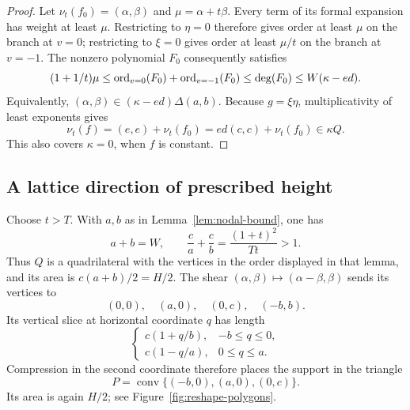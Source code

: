 \begin{proof}
Let $\nu_t(f_0)=(\alpha,\beta)$ and $\mu=\alpha+t\beta$.
Every term of its formal expansion has weight at least $\mu$.
Restricting to $\eta=0$ therefore gives order at least $\mu$ on the branch
at $v=0$; restricting to $\xi=0$ gives order at least $\mu/t$ on the
branch at $v=-1$.  The nonzero polynomial $F_0$ consequently satisfies
\[
 (1+1/t)\mu
 \le \operatorname{ord}_{v=0}(F_0)+\operatorname{ord}_{v=-1}(F_0)
 \le \deg(F_0)\le W(\kappa-ed).
\]
Equivalently, $(\alpha,\beta)\in(\kappa-ed)\Delta(a,b)$.
Because $g=\xi\eta$, multiplicativity of least exponents gives
\[
 \nu_t(f)=(e,e)+\nu_t(f_0)
          =ed(c,c)+\nu_t(f_0)\in\kappa Q.
\]
This also covers $\kappa=0$, when $f$ is constant.
\end{proof}

\subsection{A lattice direction of prescribed height}

Choose $t>T$.  With $a,b$ as in Lemma~\ref{lem:nodal-bound}, one has
\[
 a+b=W,\qquad
 \frac ca+\frac cb=\frac{(1+t)^2}{Tt}>1.
\]
Thus $Q$ is a quadrilateral with the vertices in the order displayed in
that lemma, and its area is $c(a+b)/2=H/2$.  The shear
$(\alpha,\beta)\mapsto(\alpha-\beta,\beta)$ sends its vertices to
\[
 (0,0),\quad(a,0),\quad(0,c),\quad(-b,b).
\]
Its vertical slice at horizontal coordinate $q$ has length
\begin{equation}\label{eq:first-slice-length}
 \begin{cases}
 c(1+q/b),&-b\le q\le0,\\
 c(1-q/a),&0\le q\le a.
 \end{cases}
\end{equation}
Compression in the second coordinate therefore places the support in the
triangle
\begin{equation}\label{eq:reshape-triangle}
 P=\operatorname{conv}\{(-b,0),(a,0),(0,c)\}.
\end{equation}
Its area is again $H/2$; see Figure~\ref{fig:reshape-polygons}.

